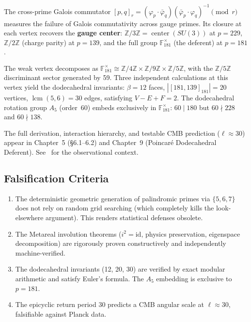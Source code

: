 The cross-prime Galois commutator $[p,q]_r = (\varphi_p \cdot \bar{\varphi}_q)(\bar{\varphi}_p \cdot \varphi_q)^{-1} \pmod{r}$ measures the failure of Galois commutativity across gauge primes. Its closure at each vertex recovers the \textbf{gauge center}: $\mathbb{Z}/3\mathbb{Z} = \operatorname{center}(SU(3))$ at $p=229$, $\mathbb{Z}/2\mathbb{Z}$ (charge parity) at $p=139$, and the full group $\mathbb{F}_{181}^{\times}$ (the deferent) at $p=181$.

The weak vertex decomposes as $\mathbb{F}_{181}^{\times} \cong \mathbb{Z}/4\mathbb{Z} \times \mathbb{Z}/9\mathbb{Z} \times \mathbb{Z}/5\mathbb{Z}$, with the $\mathbb{Z}/5\mathbb{Z}$ discriminant sector generated by 59. Three independent calculations at this vertex yield the dodecahedral invariants: $\beta = 12$ faces, $|[181,139]_{181}| = 20$ vertices, $\operatorname{lcm}(5,6) = 30$ edges, satisfying $V - E + F = 2$. The dodecahedral rotation group $A_5$ (order~60) embeds exclusively in $\mathbb{F}_{181}^{\times}$: $60 \mid 180$ but $60 \nmid 228$ and $60 \nmid 138$.

The full derivation, interaction hierarchy, and testable CMB prediction ($\ell \approx 30$) appear in Chapter~5 (\S6.1--6.2) and Chapter~9 (Poincar\'{e} Dodecahedral Deferent). See~\cite{luminet2003, planck2020} for the observational context.

\subsection{Falsification Criteria}
\begin{enumerate}
    \item The deterministic geometric generation of palindromic primes via $\{5, 6, 7\}$ does not rely on random grid searching (which completely kills the look-elsewhere argument). This renders statistical defenses obsolete.
    \item The Metareal involution theorems ($i^2 = \mathrm{id}$, physics preservation, eigenspace decomposition) are rigorously proven constructively and independently machine-verified.
    \item The dodecahedral invariants (12, 20, 30) are verified by exact modular arithmetic and satisfy Euler's formula.  The $A_5$ embedding is exclusive to $p = 181$.
    \item The epicyclic return period 30 predicts a CMB angular scale at $\ell \approx 30$, falsifiable against Planck data.
\end{enumerate}

